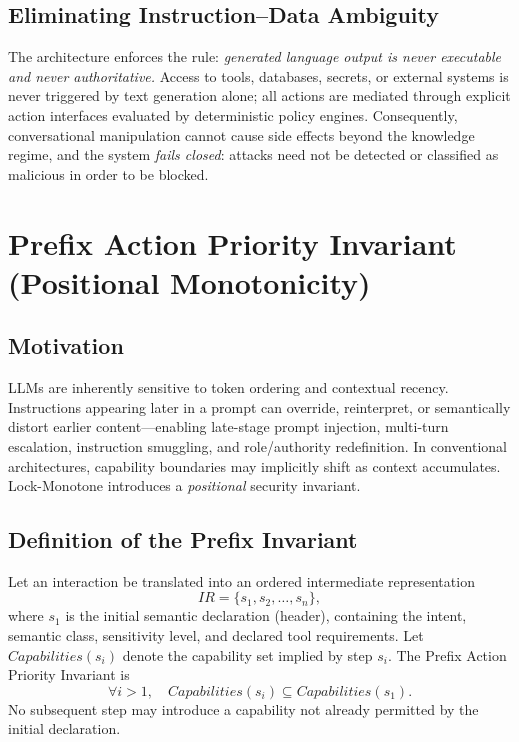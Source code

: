 \documentclass[conference]{IEEEtran}
\begin{document}
\subsection{Eliminating Instruction--Data Ambiguity}
The architecture enforces the rule: \emph{generated language output is
never executable and never authoritative.} Access to tools, databases,
secrets, or external systems is never triggered by text generation alone;
all actions are mediated through explicit action interfaces evaluated by
deterministic policy engines. Consequently, conversational manipulation
cannot cause side effects beyond the knowledge regime, and the system
\emph{fails closed}: attacks need not be detected or classified as
malicious in order to be blocked.

\section{Prefix Action Priority Invariant\\(Positional Monotonicity)}
\label{sec:prefix}

\subsection{Motivation}
LLMs are inherently sensitive to token ordering and contextual recency.
Instructions appearing later in a prompt can override, reinterpret, or
semantically distort earlier content---enabling late-stage prompt
injection, multi-turn escalation, instruction smuggling, and
role/authority redefinition. In conventional architectures, capability
boundaries may implicitly shift as context accumulates. Lock-Monotone
introduces a \emph{positional} security invariant.

\subsection{Definition of the Prefix Invariant}
Let an interaction be translated into an ordered intermediate
representation
\[
IR = \{s_1, s_2, \dots, s_n\},
\]
where $s_1$ is the initial semantic declaration (header), containing the
intent, semantic class, sensitivity level, and declared tool
requirements. Let $\mathit{Capabilities}(s_i)$ denote the capability set
implied by step $s_i$. The Prefix Action Priority Invariant is
\[
\forall i > 1, \quad \mathit{Capabilities}(s_i) \subseteq
\mathit{Capabilities}(s_1).
\]
No subsequent step may introduce a capability not already permitted by the
initial declaration.
\end{document}
